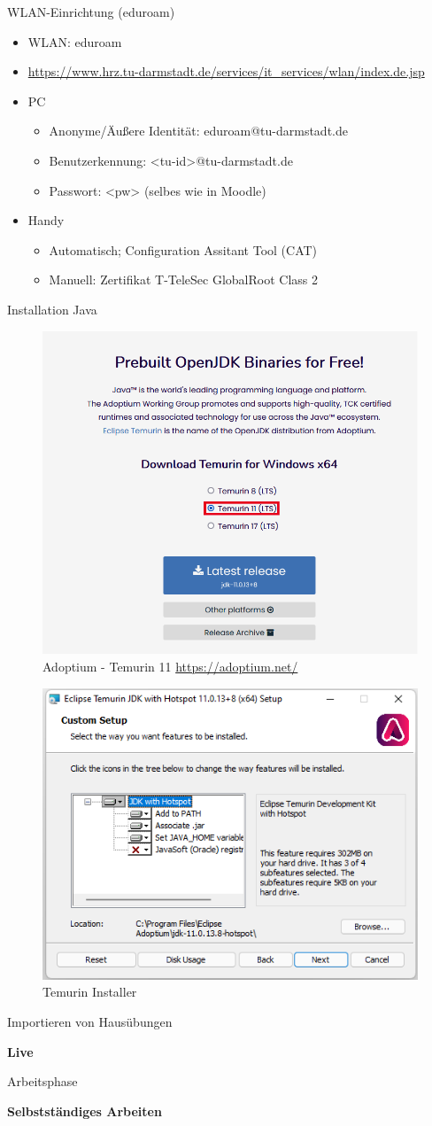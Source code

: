 \documentclass{../tuda-beamer}
\begin{document}
  \begin{frame}{WLAN-Einrichtung (eduroam)}
    \begin{itemize}
      \item WLAN: eduroam
      \item \small \url{https://www.hrz.tu-darmstadt.de/services/it_services/wlan/index.de.jsp}
      \item PC
      \begin{itemize}
        \item Anonyme/Äußere Identität: eduroam@tu-darmstadt.de
        \item Benutzerkennung: <tu-id>@tu-darmstadt.de
        \item Passwort: <pw> (selbes wie in Moodle)
      \end{itemize}
      \item Handy
      \begin{itemize}
        \item Automatisch; Configuration Assitant Tool (CAT)
        \item Manuell: Zertifikat T-TeleSec GlobalRoot Class 2
      \end{itemize}
    \end{itemize}
  \end{frame}

  \begin{frame}{Installation Java}
    \begin{figure}[h]
      \centering
      \includegraphics[width=.35\linewidth]{graphics/temurin_11.png}
      \caption{Adoptium - Temurin 11 \url{https://adoptium.net/}}
    \end{figure}
  \end{frame}

  \begin{frame}[c]
    \begin{figure}[h]
      \centering
      \includegraphics[width=.3\linewidth]{graphics/temurin_installer.png}
      \caption{Temurin Installer}
    \end{figure}
  \end{frame}

  \begin{frame}[c]{Importieren von Hausübungen}
    \begin{center}
      \textbf{\LARGE Live}
    \end{center}
  \end{frame}

  \begin{frame}[c]{Arbeitsphase}
    \begin{center}
      \textbf{\LARGE Selbstständiges Arbeiten}
    \end{center}
  \end{frame}
\end{document}
